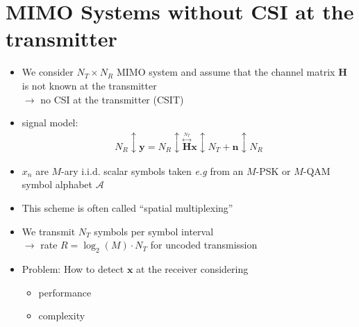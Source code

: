 \documentclass[a4paper, 10pt]{article}
\begin{document}
\section{MIMO Systems without CSI at the transmitter}
\begin{itemize}
	\item We consider $N_T\times N_R$ MIMO system and assume that the channel matrix $\mathbf{H}$ is not known at the transmitter\\
	$\rightarrow$ no CSI at the transmitter (CSIT)
	\item signal model:
	\begin{align*}
		N_R \updownarrow\mathbf{y}=N_R \updownarrow \overset{\overset{N_T}{\longleftrightarrow}}{\mathbf{H}}\mathbf{x}\updownarrow N_T+\mathbf{n} \updownarrow N_R
	\end{align*}
	\begin{figure}[h]
		\centering
		
	\end{figure}
	\item $x_n$ are $M$-ary i.i.d. scalar symbols taken \textit{e.g} from an $M$-PSK or $M$-QAM symbol alphabet $\mathscr{A}$
	\item This scheme is often called ``spatial multiplexing''
	\item We transmit $N_T$ symbols per symbol interval\\
	$\rightarrow$ rate $R=\log_2(M)\cdot N_T$ for uncoded transmission
	\item Problem: How to detect $\mathbf{x}$ at the receiver considering
		\begin{itemize}
			\item performance
			\item complexity
		\end{itemize}
\end{itemize}
\end{document}
